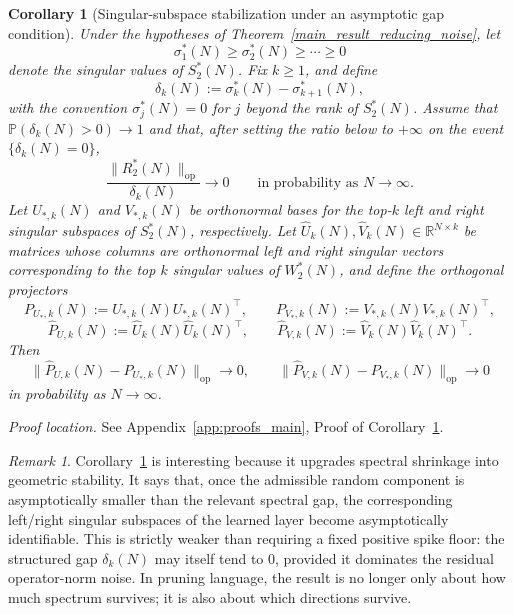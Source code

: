 \documentclass[11pt]{article}
\theoremstyle{plain}
\newtheorem{cor}[thm]{Corollary}
\theoremstyle{definition}
\theoremstyle{remark}
\newtheorem{rem}[thm]{Remark}
\newcommand{\R}{\mathbb{R}}
\newcommand{\PP}{\mathbb{P}}
\newcommand{\op}{\mathrm{op}}
\newcommand{\1}{\mathbf{1}}
\newcommand{\proofloc}[1]{\par\noindent\emph{Proof location.} #1\par}
\begin{document}
\begin{cor}[Singular-subspace stabilization under an asymptotic gap condition]
\label{cor:subspace_stabilization}
Under the hypotheses of Theorem~\ref{main_result_reducing_noise}, let
\[
\sigma_1^*(N)\ge \sigma_2^*(N)\ge \cdots \ge 0
\]
denote the singular values of \(S_2^*(N)\). Fix \(k\ge1\), and define
\[
\delta_k(N):=
\sigma_k^*(N)-\sigma_{k+1}^*(N),
\]
with the convention \(\sigma_j^*(N)=0\) for \(j\) beyond the rank of \(S_2^*(N)\). Assume that \(\PP(\delta_k(N)>0)\to1\) and that, after setting the ratio below to \(+\infty\) on the event \(\{\delta_k(N)=0\}\),
\[
\frac{\|R_2^*(N)\|_{\op}}{\delta_k(N)}\to 0
\qquad\text{in probability as }N\to\infty.
\]
Let \(U_{*,k}(N)\) and \(V_{*,k}(N)\) be orthonormal bases for the top-\(k\) left and right singular subspaces of \(S_2^*(N)\), respectively.
Let \(\widehat U_k(N),\widehat V_k(N)\in\R^{N\times k}\) be matrices whose columns are orthonormal left and right singular vectors corresponding to the top \(k\) singular values of \(W_2^*(N)\), and define the orthogonal projectors
\[
P_{U_*,k}(N):=U_{*,k}(N)U_{*,k}(N)^\top,
\qquad
P_{V_*,k}(N):=V_{*,k}(N)V_{*,k}(N)^\top,
\]
\[
\widehat P_{U,k}(N):=\widehat U_k(N)\widehat U_k(N)^\top,
\qquad
\widehat P_{V,k}(N):=\widehat V_k(N)\widehat V_k(N)^\top.
\]
Then
\[
\|\widehat P_{U,k}(N)-P_{U_*,k}(N)\|_{\op}\to0,
\qquad
\|\widehat P_{V,k}(N)-P_{V_*,k}(N)\|_{\op}\to0
\]
in probability as \(N\to\infty\).
\end{cor}
\proofloc{See Appendix~\ref{app:proofs_main}, Proof of Corollary~\ref{cor:subspace_stabilization}.}

\begin{rem}
Corollary~\ref{cor:subspace_stabilization} is interesting because it upgrades spectral shrinkage into geometric stability. It says that, once the admissible random component is asymptotically smaller than the relevant spectral gap, the corresponding left/right singular subspaces of the learned layer become asymptotically identifiable. This is strictly weaker than requiring a fixed positive spike floor: the structured gap \(\delta_k(N)\) may itself tend to \(0\), provided it dominates the residual operator-norm noise. In pruning language, the result is no longer only about how much spectrum survives; it is also about which directions survive.
\end{rem}
\end{document}
